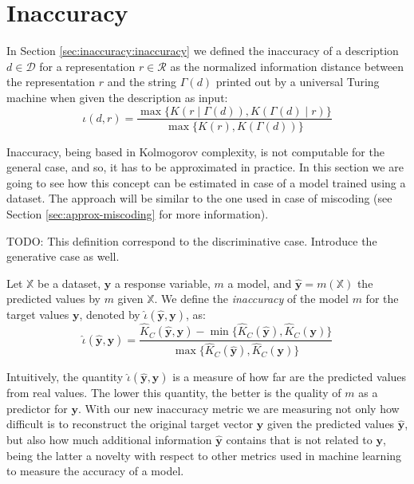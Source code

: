 \section{Inaccuracy}
\label{sec:machine_learning_inaccuracy}

In Section \ref{sec:inaccuracy:inaccuracy} we defined the inaccuracy of a description $d \in \mathcal{D}$ for a representation $r \in \mathcal{R}$ as the normalized information distance between the representation $r$ and the string $\Gamma(d)$ printed out by a universal Turing machine when given the description as input:
\[
\iota(d, r) = \frac{ \max\{ K \left(r \mid \Gamma(d) \right), K \left( \Gamma(d) \mid r \right) \} } { \max\{ K(r), K \left(\Gamma(d) \right) \} }
\]

Inaccuracy, being based in Kolmogorov complexity, is not computable for the general case, and so, it has to be approximated in practice. In this section we are going to see how this concept can be estimated in case of a model trained using a dataset. The approach will be similar to the one used in case of miscoding (see Section \ref{sec:approx-miscoding} for more information).




{\color{red} TODO: This definition correspond to the discriminative case. Introduce the generative case as well.}

\begin{definition}
Let $\mathbb{X}$ be a dataset, $\mathbf{y}$ a response variable, $m$ a model, and $\mathbf{\hat{y}} = m(\mathbb{X})$ the predicted values by $m$ given $\mathbb{X}$. We define the \emph{inaccuracy} of the model $m$ for the target values $\mathbf{y}$, denoted by $\hat\iota(\mathbf{\hat{y}}, \mathbf{y})$, as:
\[
\hat\iota(\mathbf{\hat{y}}, \mathbf{y}) = \frac{ \hat{K}_C(\mathbf{\hat{y}}, \mathbf{y}) - \min\{ \hat{K}_C(\mathbf{\hat{y}}), \hat{K}_C(\mathbf{y}) \} } { \max\{ \hat{K}_C(\mathbf{\hat{y}}), \hat{K}_C(\mathbf{y}) \} }
\]\end{definition}

Intuitively, the quantity $\hat\iota(\mathbf{\hat{y}}, \mathbf{y})$ is a measure of how far are the predicted values from real values. The lower this quantity, the better is the quality of $m$ as a predictor for $\mathbf{y}$. With our new inaccuracy metric we are measuring not only how difficult is to reconstruct the original target vector $\mathbf{y}$ given the predicted values $\mathbf{\hat{y}}$, but also how much additional information $\mathbf{\hat{y}}$ contains that is not related to $\mathbf{y}$, being the latter a novelty with respect to other metrics used in machine learning to measure the accuracy of a model.

